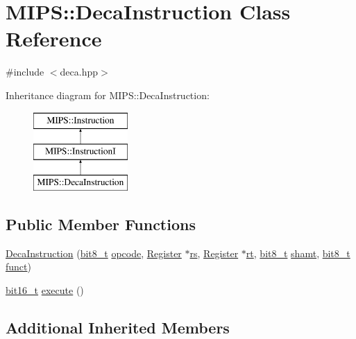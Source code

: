 \hypertarget{classMIPS_1_1DecaInstruction}{}\section{M\+I\+PS\+:\+:Deca\+Instruction Class Reference}
\label{classMIPS_1_1DecaInstruction}


{\ttfamily \#include $<$deca.\+hpp$>$}

Inheritance diagram for M\+I\+PS\+:\+:Deca\+Instruction\+:\begin{figure}[H]
\begin{center}
\leavevmode
\includegraphics[height=3.000000cm]{classMIPS_1_1DecaInstruction}
\end{center}
\end{figure}
\subsection*{Public Member Functions}
\begin{DoxyCompactItemize}
\item 
\hyperlink{classMIPS_1_1DecaInstruction_a12f8f1eb9e3cf3afd1a08353b55e2062}{Deca\+Instruction} (\hyperlink{core_8hpp_a6074bae122ae7b527864eec42c728c3c}{bit8\+\_\+t} \hyperlink{classMIPS_1_1Instruction_a45cc6808b5dde8a5d41067d148b55476}{opcode}, \hyperlink{classMIPS_1_1Register}{Register} $\ast$\hyperlink{classMIPS_1_1InstructionI_a2be191d5b3dce505e2e626ec02eb4d62}{rs}, \hyperlink{classMIPS_1_1Register}{Register} $\ast$\hyperlink{classMIPS_1_1InstructionI_add1db07a5c954f35271de8c8a5737487}{rt}, \hyperlink{core_8hpp_a6074bae122ae7b527864eec42c728c3c}{bit8\+\_\+t} \hyperlink{classMIPS_1_1InstructionI_aa9b6da37c374c2ec8d96448d341e5e7d}{shamt}, \hyperlink{core_8hpp_a6074bae122ae7b527864eec42c728c3c}{bit8\+\_\+t} \hyperlink{classMIPS_1_1InstructionI_a5c6efcbbd233a7447c1fe24ea0a1e558}{funct})
\item 
\hyperlink{core_8hpp_adc265a970bc35995b5879784bbb3f1b7}{bit16\+\_\+t} \hyperlink{classMIPS_1_1DecaInstruction_a82c3d685d910d2c52163f5faa1750aca}{execute} ()
\end{DoxyCompactItemize}
\subsection*{Additional Inherited Members}


